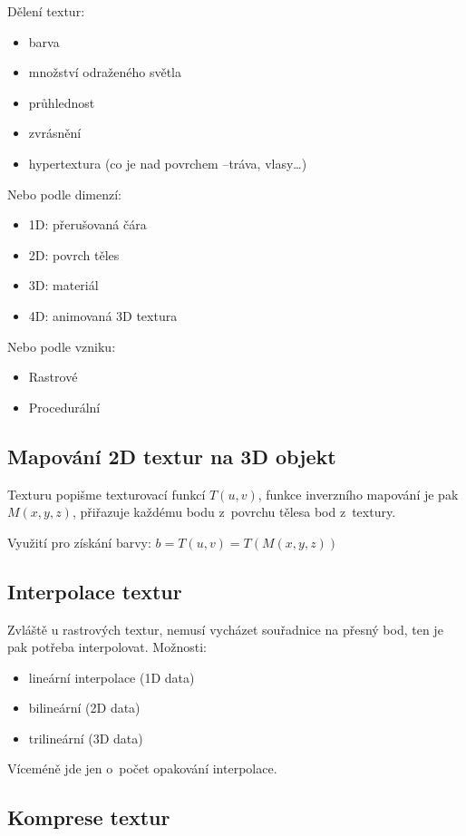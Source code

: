 Dělení textur:
\begin{itemize}
    \item barva
    \item množství odraženého světla
    \item průhlednost
    \item zvrásnění
    \item hypertextura (co je nad povrchem --tráva, vlasy\dots)
\end{itemize}

Nebo podle dimenzí:
\begin{itemize}
    \item 1D: přerušovaná čára
    \item 2D: povrch těles
    \item 3D: materiál
    \item 4D: animovaná 3D textura
\end{itemize}

Nebo podle vzniku:
\begin{itemize}
    \item Rastrové
    \item Procedurální
\end{itemize}

\subsection{Mapování 2D textur na 3D objekt}
Texturu popišme texturovací funkcí \(T(u,v)\), funkce inverzního mapování je pak \(M(x,y,z)\), přiřazuje každému bodu z~povrchu tělesa bod z~textury.

Využití pro získání barvy: \(b=T(u,v)=T(M(x,y,z))\)

\subsection{Interpolace textur}
Zvláště u rastrových textur, nemusí vycházet souřadnice na přesný bod, ten je pak potřeba interpolovat. Možnosti:
\begin{itemize}
    \item lineární interpolace (1D data)
    \item bilineární (2D data)
    \item trilineární (3D data)
\end{itemize}
Víceméně jde jen o~počet opakování interpolace.

\subsection{Komprese textur}
